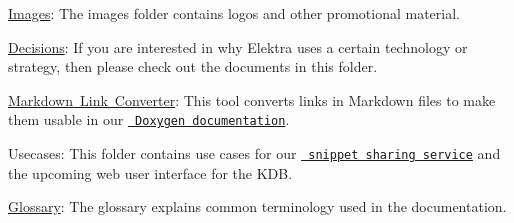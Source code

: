 \begin{DoxyItemize}
\item \mbox{\hyperlink{doc_images_README_md}{Images}}\+: The images folder contains logos and other promotional material.
\item \mbox{\hyperlink{doc_decisions_README_md}{Decisions}}\+: If you are interested in why Elektra uses a certain technology or strategy, then please check out the documents in this folder.
\item \mbox{\hyperlink{doc_markdownlinkconverter_README_md}{Markdown Link Converter}}\+: This tool converts links in Markdown files to make them usable in our \href{https://doc.libelektra.org/api/current/html}{\texttt{ Doxygen documentation}}.
\item Usecases\+: This folder contains use cases for our \href{https://www.libelektra.org/auth/login}{\texttt{ snippet sharing service}} and the upcoming web user interface for the K\+DB.
\item \mbox{\hyperlink{doc_help_elektra-glossary_md}{Glossary}}\+: The glossary explains common terminology used in the documentation. 
\end{DoxyItemize}